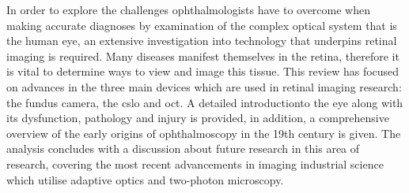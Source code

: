 \documentclass[11pt, a4paper, oneside]{Thesis}
\begin{document}
\begin{titlepage}
In order to explore the challenges ophthalmologists have to overcome when making
accurate diagnoses by examination of the complex optical system that is the human eye,
an extensive investigation into technology that underpins retinal imaging is required.
Many diseases manifest themselves in the retina, therefore it is vital to determine ways
to view and image this tissue. This review has focused on advances in the three main
devices which are used in retinal imaging research: the fundus camera, the \Gls{cslo}
and \Gls{oct}. A detailed introductionto the eye along with its dysfunction, pathology and
injury is provided, in addition, a comprehensive overview of the early origins of
ophthalmoscopy in the 19th century is given. The analysis concludes with a discussion
about future research in this area of research, covering the most recent advancements
in imaging industrial science which utilise adaptive optics and two-photon microscopy.
\end{titlepage}




\clearpage %
 
\pagestyle{fancy}

\tableofcontents %

\clearpage %


\mainmatter %
\pagestyle{fancy}








\end{document}
